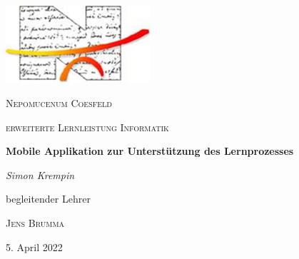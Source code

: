 \begin{titlepage}
	\centering
	\includegraphics[width=0.4\textwidth]{images/logo.png}\par\vspace{1cm}
	{\scshape\LARGE Nepomucenum Coesfeld \par}
	\vspace{1cm}
	{\scshape\Large erweiterte Lernleistung Informatik\par}
	\vspace{1.5cm}
	{\huge\bfseries Mobile Applikation zur Unterstützung des Lernprozesses\par}
	\vspace{2cm}
	{\Large\itshape Simon Krempin\par}
	\vfill
	begleitender Lehrer\par
	\textsc{Jens Brumma}

	\vfill

	{\large 5. April 2022\par}
\end{titlepage}
\clearpage
\tableofcontents
{}
\clearpage

